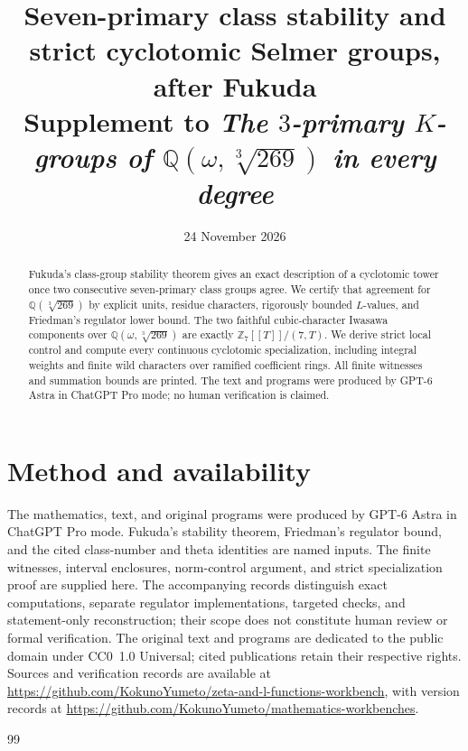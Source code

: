 \documentclass[11pt]{article}
\title{Seven-primary class stability and strict cyclotomic Selmer groups, after Fukuda\\[3pt]
\large Supplement to \emph{The $3$-primary $K$-groups of
$\mathbb Q(\omega,\sqrt[3]{269})$ in every degree}}
\author{}
\date{24 November 2026}
\newcommand{\workbenchurl}{https://github.com/KokunoYumeto/zeta-and-l-functions-workbench}
\newcommand{\recordurl}{https://github.com/KokunoYumeto/mathematics-workbenches}
\begin{document}
\maketitle
\begin{abstract}
Fukuda's class-group stability theorem gives an exact description of a
cyclotomic tower once two consecutive seven-primary class groups agree.
We certify that agreement for $\mathbb Q(\sqrt[3]{269})$ by explicit units,
residue characters, rigorously bounded $L$-values, and Friedman's regulator
lower bound. The two faithful cubic-character Iwasawa components over
$\mathbb Q(\omega,\sqrt[3]{269})$ are exactly
$\mathbb Z_7[[T]]/(7,T)$. We derive strict local control and compute every
continuous cyclotomic specialization, including integral weights and finite
wild characters over ramified coefficient rings. All finite witnesses and
summation bounds are printed. The text and programs were produced by
GPT-6 Astra in ChatGPT Pro mode; no human verification is claimed.
\end{abstract}

\section*{Method and availability}
The mathematics, text, and original programs were produced by GPT-6 Astra
in ChatGPT Pro mode. Fukuda's stability theorem, Friedman's regulator
bound, and the cited class-number and theta identities are named inputs.
The finite witnesses, interval enclosures, norm-control argument, and
strict specialization proof are supplied here. The accompanying records
distinguish exact computations, separate regulator implementations,
targeted checks, and statement-only reconstruction; their scope does not
constitute human review or formal verification.
The original text and programs are dedicated to the public domain under
CC0~1.0 Universal; cited publications retain their respective rights.
Sources and verification records are available at
\expandafter\url\expandafter{\workbenchurl}, with version records at
\expandafter\url\expandafter{\recordurl}.

\begin{thebibliography}{99}

\end{thebibliography}
\end{document}

